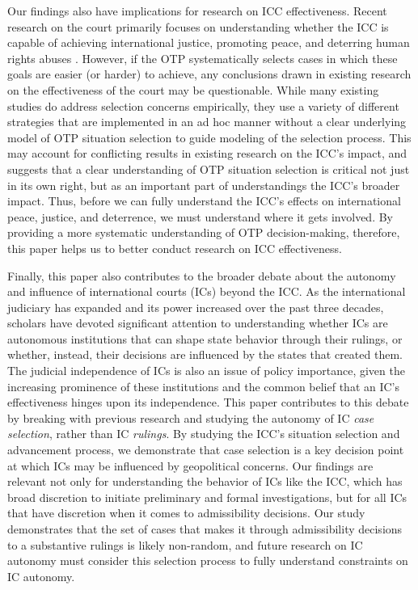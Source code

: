 Our findings also have implications for research on ICC effectiveness. Recent research on the court primarily focuses on understanding whether the ICC is capable of achieving international justice, promoting peace, and deterring human rights abuses \citep{appel2018shadow, hillebrecht2016deterrent, jo2016can, prorok2017compatibility}. However, if the OTP systematically selects cases in which these goals are easier (or harder) to achieve, any conclusions drawn in existing research on the effectiveness of the court may be questionable. While many existing studies do address selection concerns empirically, they use a variety of different strategies that are implemented in an ad hoc manner without a clear underlying model of OTP situation selection to guide modeling of the selection process. This may account for conflicting results in existing research on the ICC's impact, and suggests that a clear understanding of OTP situation selection is critical not just in its own right, but as an important part of understandings the ICC's broader impact. Thus, before we can fully understand the ICC's effects on international peace, justice, and deterrence, we must understand where it gets involved. By providing a more systematic understanding of OTP decision-making, therefore, this paper helps us to better conduct research on ICC effectiveness.

Finally, this paper also contributes to the broader debate about the autonomy and influence of international courts (ICs) beyond the ICC. As the international judiciary has expanded and its power increased over the past three decades, scholars have devoted significant attention to understanding whether ICs are autonomous institutions that can shape state behavior through their rulings, or whether, instead, their decisions are influenced by the states that created them. The judicial independence of ICs is also an issue of policy importance, given the increasing prominence of these institutions and the common belief that an IC's effectiveness hinges upon its independence. This paper contributes to this debate by breaking with previous research and studying the autonomy of IC \textit{case selection}, rather than IC \textit{rulings}. By studying the ICC's situation selection and advancement process, we demonstrate that case selection is a key decision point at which ICs may be influenced by geopolitical concerns. Our findings are relevant not only for understanding the behavior of ICs like the ICC, which has broad discretion to initiate preliminary and formal investigations, but for all ICs that have discretion when it comes to admissibility decisions. Our study demonstrates that the set of cases that makes it through admissibility decisions to a substantive rulings is likely non-random, and future research on IC autonomy must consider this selection process to fully understand constraints on IC autonomy.
